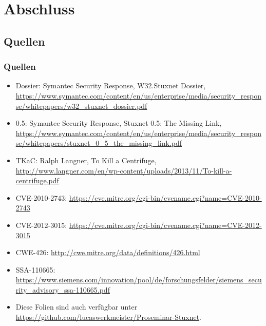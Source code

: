 \documentclass{beamer}
\begin{document}
\section{Abschluss}

\subsection{Quellen}

\begin{frame}
  \frametitle{Quellen}
  \fontsize{6pt}{7.2}\selectfont
  \begin{itemize}
    \item Dossier: Symantec Security Response, W32.Stuxnet Dossier, \url{https://www.symantec.com/content/en/us/enterprise/media/security_response/whitepapers/w32_stuxnet_dossier.pdf}
    \item 0.5: Symantec Security Response, Stuxnet 0.5: The Missing Link, \url{https://www.symantec.com/content/en/us/enterprise/media/security_response/whitepapers/stuxnet_0_5_the_missing_link.pdf}
    \item TKaC: Ralph Langner, To Kill a Centrifuge, \url{http://www.langner.com/en/wp-content/uploads/2013/11/To-kill-a-centrifuge.pdf}
    \item CVE-2010-2743: \url{https://cve.mitre.org/cgi-bin/cvename.cgi?name=CVE-2010-2743}
    \item CVE-2012-3015: \url{https://cve.mitre.org/cgi-bin/cvename.cgi?name=CVE-2012-3015}
    \item CWE-426: \url{http://cwe.mitre.org/data/definitions/426.html}
    \item SSA-110665: \url{https://www.siemens.com/innovation/pool/de/forschungsfelder/siemens_security_advisory_ssa-110665.pdf}
    \item Diese Folien sind auch verfügbar unter \url{https://github.com/lucaswerkmeister/Proseminar-Stuxnet}.
  \end{itemize}
\end{frame}
\end{document}
